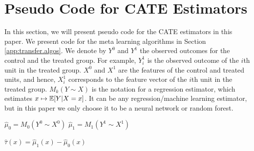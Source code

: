 \newcommand{\X}{\mathcal{X}}
\newcommand{\I}{\mathcal{I}}
\newcommand{\J}{\mathcal{J}}
\renewcommand{\P}{\mathcal{P}}
\newcommand{\Yobst}{Y^{obs,t}}
\newcommand{\Yobsc}{Y^{obs,c}}
\newcommand{\var}{\mbox{Var}}
\newcommand{\sd}{\mbox{Sd}}
\newcommand{\cov}{\mbox{Cov}}
\newcommand{\Dt}{\tilde D}
\newcommand{\taun}{\hat{\tau}^{mn}}
\newcommand{\theoremfont}{\itshape}
\renewcommand{\descriptionlabel}[1]{\hspace{\labelsep}\textbf{\descriptionlabelfont #1}}
\newcommand{\D}{\mathcal{D}}
\newcommand{\trace}{\mbox{trace}}
\newcommand{\IMSE}{\mbox{IMSE}}
\newcommand{\EMSE}{\mbox{EMSE}}
\newcommand{\MSE}{\mbox{MSE}}
\newcommand{\BIAS}{\mbox{BIAS}}
\newcommand{\mae}{\gamma_{\scriptsize\mbox{max}}}
\newcommand{\mie}{\gamma_{\scriptsize\mbox{min}}}
\newcommand{\mis}{s_{\scriptsize\mbox{min}}}
\newcommand{\ED}{\mathbb{E}_{\mathcal{D}}}
\newcommand{\Ex}{\mathbb{E}_{x}}
\newcommand{\Pobs}{\mathcal{P}_{\mbox{\tiny observed}}}
\newcommand{\deltat}{\tilde \delta}
\newcommand{\Sb}{{\bar S}}
\section{Pseudo Code for CATE Estimators}
\label{app:learners}

In this section, we will present pseudo code for the CATE estimators in this paper. We present code for the meta learning algorithms in Section \ref{app:transfer.algos}.
We denote by $Y^0$ and $Y^1$ the observed outcomes for the control and the treated group. For example, $Y^1_i$ is the observed outcome of the $i$th unit in the treated group. $X^0$ and $X^1$ are the features of the control and treated units, and hence, $X^1_i$  corresponds to the feature vector of the $i$th unit in the treated group. $M_k(Y\sim X)$ is  the notation for a regression estimator, which estimates $x \mapsto \mathbb{E}[Y|X=x]$. It can be any regression/machine learning estimator, but in this paper we only choose it to be a neural network or random forest.

\begin{algorithm}[H] 
	\begin{algorithmic}[1]
		
		\State $\hat \mu_0 	= M_0(Y^0 \sim X^0)$
		\State $\hat \mu_1	 = M_1(Y^1 \sim X^1)$
		
		\item[]
		\State $\hat \tau(x) = \hat \mu_1(x) - \hat \mu_0(x)$ 
		\EndProcedure
	\end{algorithmic}
	\caption{T-learner}
	
	\label{algo:Tlearner}
\end{algorithm}

